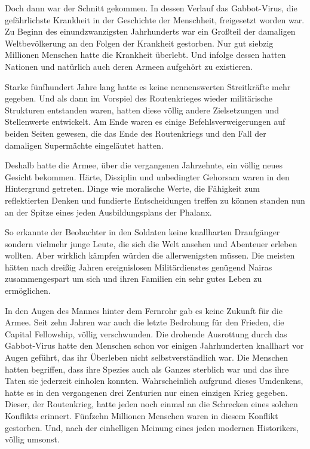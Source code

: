 \par

Doch dann war der Schnitt gekommen. In dessen Verlauf das Gabbot-Virus, die gefährlichste Krankheit in der Geschichte der Menschheit, freigesetzt worden war. Zu Beginn des einundzwanzigsten Jahrhunderts war ein Großteil der damaligen Weltbevölkerung an den Folgen der Krankheit gestorben. Nur gut siebzig Millionen Menschen hatte die Krankheit überlebt. Und infolge dessen hatten Nationen und natürlich auch deren Armeen aufgehört zu existieren.

\par

Starke fünfhundert Jahre lang hatte es keine nennenswerten Streitkräfte mehr gegeben. Und als dann im Vorspiel des Routenkrieges wieder militärische Strukturen entstanden waren, hatten diese völlig andere Zielsetzungen und Stellenwerte entwickelt. Am Ende waren es einige Befehlsverweigerungen auf beiden Seiten gewesen, die das Ende des Routenkriegs und den Fall der damaligen Supermächte eingeläutet hatten.

\par

Deshalb hatte die Armee, über die vergangenen Jahrzehnte, ein völlig neues Gesicht bekommen. Härte, Disziplin und unbedingter Gehorsam waren in den Hintergrund getreten. Dinge wie moralische Werte, die Fähigkeit zum reflektierten Denken und fundierte Entscheidungen treffen zu können standen nun an der Spitze eines jeden Ausbildungsplans der Phalanx.

\par

So erkannte der Beobachter in den Soldaten keine knallharten Draufgänger sondern vielmehr junge Leute, die sich die Welt ansehen und Abenteuer erleben wollten. Aber wirklich kämpfen würden die allerwenigsten müssen. Die meisten hätten nach dreißig Jahren ereignislosen Militärdienstes genügend Nairas zusammengespart um sich und ihren Familien ein sehr gutes Leben zu ermöglichen.

\par

In den Augen des Mannes hinter dem Fernrohr gab es keine Zukunft für die Armee. Seit zehn Jahren war auch die letzte Bedrohung für den Frieden, die Capital Fellowship, völlig verschwunden. Die drohende Ausrottung durch das Gabbot-Virus hatte den Menschen schon vor einigen Jahrhunderten knallhart vor Augen geführt, das ihr Überleben nicht selbstverständlich war. Die Menschen hatten begriffen, dass ihre Spezies auch als Ganzes sterblich war und das ihre Taten sie jederzeit einholen konnten. Wahrscheinlich aufgrund dieses Umdenkens, hatte es in den vergangenen drei Zenturien nur einen einzigen Krieg gegeben. Dieser, der Routenkrieg, hatte jeden noch einmal an die Schrecken eines solchen Konflikts erinnert. Fünfzehn Millionen Menschen waren in diesem Konflikt gestorben. Und, nach der einhelligen Meinung eines jeden modernen Historikers, völlig umsonst.

